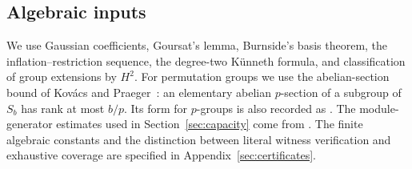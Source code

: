 \subsection{Algebraic inputs}
We use Gaussian coefficients, Goursat's lemma, Burnside's basis
theorem, the inflation--restriction sequence, the degree-two
K\"unneth formula, and classification of group extensions by $H^2$.
For permutation groups we use the abelian-section bound of
Kov\'acs and Praeger~\cite{KovacsPraeger1989}: an elementary abelian
$p$-section of a subgroup of $S_b$ has rank at most $b/p$.
Its form for $p$-groups is also recorded as
\cite[Theorem 2.8]{RoneyDougalTracey2025}.
The module-generator estimates used in Section~\ref{sec:capacity}
come from \cite[Definition 1.5, Theorem 1.6 and Corollary 3.12]{Tracey2018}.
The finite algebraic constants and the distinction between literal
witness verification and exhaustive coverage are specified in
Appendix~\ref{sec:certificates}.

